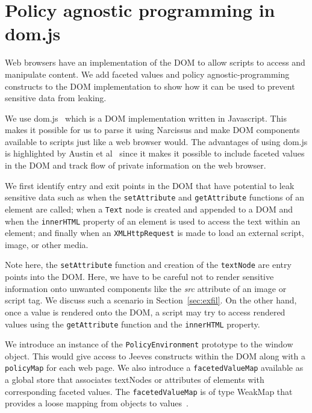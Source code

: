 \section{Policy agnostic programming in dom.js}
Web browsers have an implementation of the DOM to allow scripts to
access and manipulate content. We add faceted values and policy agnostic-programming
constructs to the DOM implementation to show how it can be used to prevent
sensitive data from leaking.

We use dom.js~\cite{dom.js} which is a DOM implementation written in
Javascript. This makes it possible for us to parse it using Narcissus
and make DOM components available to scripts just like a web browser would. The
advantages of using dom.js is highlighted by Austin et al~\cite[Section 9.3]{TOPLAS}
since it makes it possible to include faceted values in the DOM and track flow of
private information on the web browser.

We first identify entry and exit points in the DOM that have potential
to leak sensitive data such as when the \texttt{setAttribute} and \texttt{getAttribute}
functions of an element are called; when a \texttt{Text} node is created
and appended to a DOM and when the \texttt{innerHTML} property of an element
is used to access the text within an element; and finally when an
\texttt{XMLHttpRequest} is made to load an external script, image, or other media.

Note here, the \texttt{setAttribute} function and creation of the \texttt{textNode}
are entry points into the DOM. Here, we have to be careful not to render sensitive
information onto unwanted components like the \textit{src} attribute of an image
or script tag. We discuss such a scenario in Section~\ref{sec:exfil}. On the
other hand, once a value is rendered onto the DOM, a script may try to access rendered
values using the \texttt{getAttribute} function and the \texttt{innerHTML} property.

We introduce an instance of the \texttt{PolicyEnvironment} prototype to the window
object. This would give access to Jeeves constructs within the DOM along with a
\texttt{policyMap} for each web page. We also introduce a \texttt{facetedValueMap}
available as a global store that associates textNodes or attributes of elements
with corresponding faceted values. The \texttt{facetedValueMap} is of
type WeakMap that provides a loose mapping from objects to values~\cite{WeakMap}.

